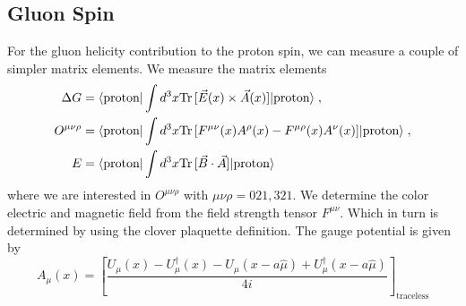 \documentclass[a4paper,10pt]{scrartcl}
\newcommand{\tr}{\text{Tr\,}}
\begin{document}
\subsection{Gluon Spin}
For the gluon helicity contribution to the proton spin, we can measure a couple of simpler matrix elements. We measure the matrix elements
\begin{align}
    \Delta G &= \langle \text{proton} | \int d^3x \tr [ \vec E(x) \times \vec A(x)] | \text{proton} \rangle \; , \\
    O^{\mu \nu \rho} &= \langle \text{proton} | \int d^3x \tr [ F^{\mu \nu}(x) A^\rho(x) - F^{\mu \rho}(x) A^\nu(x)] | \text{proton} \rangle \; , \\
    E &= \langle \text{proton} | \int d^3x \tr [ \vec B \cdot \vec A] | \text{proton} \rangle \notag \;
\end{align}
where we are interested in $O^{\mu \nu \rho}$ with $\mu \nu \rho = 021, 321$. We determine the color electric and magnetic field from the field strength
tensor $F^{\mu \nu}$. Which in turn is determined by using the clover plaquette definition. The gauge potential is given by 
\begin{equation}
    A_\mu(x) = \left[ \frac{U_\mu(x)- U_\mu^\dagger(x) - U_\mu(x - a \hat \mu) + U_\mu^\dagger(x - a \hat \mu)}{4 i} \right]_\text{traceless}
\end{equation}
\end{document}
